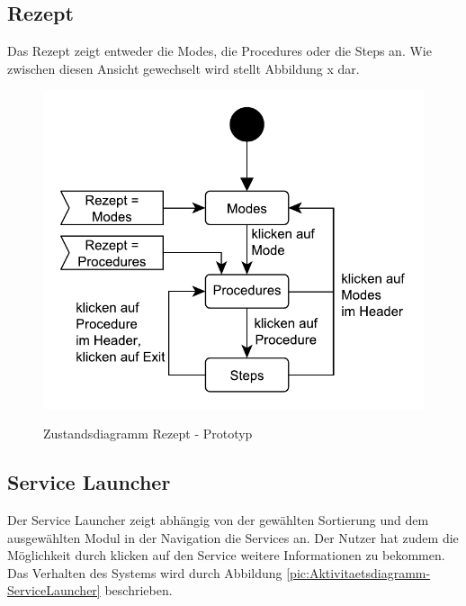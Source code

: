 \subsection{Rezept}
Das Rezept zeigt entweder die Modes, die Procedures oder die Steps an. Wie zwischen diesen Ansicht gewechselt wird stellt Abbildung x dar.
\begin{figure}[htbp]
\centering
\includegraphics[scale=0.6]{DA_files/UML/Prototyp/Zustandsdiagramm-Rezept.pdf}
\label{pic:Zustandsdiagramm-Rezept}
\caption{Zustandsdiagramm Rezept - Prototyp}
\end{figure}



\subsection{Service Launcher}
Der Service Launcher zeigt abhängig von der gewählten Sortierung und dem ausgewählten Modul in der Navigation die Services an. Der Nutzer hat zudem die Möglichkeit durch klicken auf den Service weitere Informationen zu bekommen. Das Verhalten des Systems wird durch Abbildung \ref{pic:Aktivitaetsdiagramm-ServiceLauncher} beschrieben.

